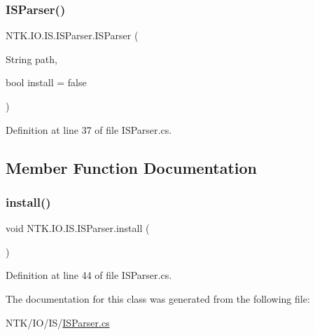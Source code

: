 \subsubsection{\texorpdfstring{ISParser()}{ISParser()}}
{\footnotesize\ttfamily N\+T\+K.\+I\+O.\+I\+S.\+I\+S\+Parser.\+I\+S\+Parser (\begin{DoxyParamCaption}\item[{String}]{path,  }\item[{bool}]{install = {\ttfamily false} }\end{DoxyParamCaption})}



Definition at line 37 of file I\+S\+Parser.\+cs.



\subsection{Member Function Documentation}
\mbox{\label{class_n_t_k_1_1_i_o_1_1_i_s_1_1_i_s_parser_aec037e7d4edd8cd7bf83111a59ab5e2a}} 
\subsubsection{\texorpdfstring{install()}{install()}}
{\footnotesize\ttfamily void N\+T\+K.\+I\+O.\+I\+S.\+I\+S\+Parser.\+install (\begin{DoxyParamCaption}{ }\end{DoxyParamCaption})}



Definition at line 44 of file I\+S\+Parser.\+cs.



The documentation for this class was generated from the following file\+:\begin{DoxyCompactItemize}
\item 
N\+T\+K/\+I\+O/\+I\+S/\mbox{\hyperlink{_i_s_parser_8cs}{I\+S\+Parser.\+cs}}\end{DoxyCompactItemize}
